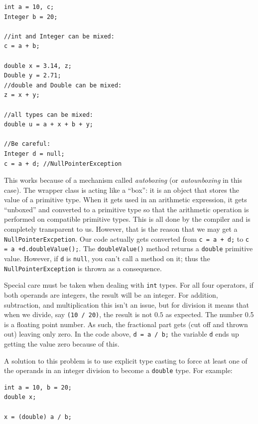 \begin{verbatim}
int a = 10, c;
Integer b = 20;

//int and Integer can be mixed:
c = a + b;

double x = 3.14, z;
Double y = 2.71;
//double and Double can be mixed:
z = x + y;

//all types can be mixed:
double u = a + x + b + y;

//Be careful:
Integer d = null;
c = a + d; //NullPointerException
\end{verbatim}

This works because of a mechanism called \emph{autoboxing} (or \emph{autounboxing} in
this case).  The wrapper class is acting like a ``box'': it is an object that stores
the value of a primitive type.  When it gets used in an arithmetic expression, it
gets ``unboxed'' and converted to a primitive type so that the arithmetic
operation is performed on compatible primitive types.  This is all done by the 
compiler and is completely transparent to us.  However, that is the reason that
we may get a \texttt{NullPointerExcpetion}.  Our code actually gets
converted from \texttt{c = a + d;} to \texttt{c = a +d.doubleValue();}.
The \texttt{doubleValue()} method returns a \texttt{double} primitive
value.  However, if \texttt{d} is \texttt{null}, you can't call
a method on it; thus the \texttt{NullPointerException} is thrown
as a consequence.

Special care must be taken when dealing with \texttt{int} types.  
For all four operators, if both operands are integers, the result will be an
integer.  For addition, subtraction, and multiplication this isn't an issue, but
for division it means that when we divide, say \texttt{(10 / 20)}, the result
is not $0.5$ as expected.  The number 0.5 is a floating point number.  As
such, the fractional part gets  (cut off and thrown out) leaving
only zero.  In the code above, \texttt{d = a / b;} the variable \texttt{d}
ends up getting the value zero because of this.

A solution to this problem is to use explicit \gls{type casting} to force at
least one of the operands in an integer division to become a \texttt{double}
type.  For example:

\begin{verbatim}
int a = 10, b = 20;
double x;

x = (double) a / b; 
\end{verbatim}

